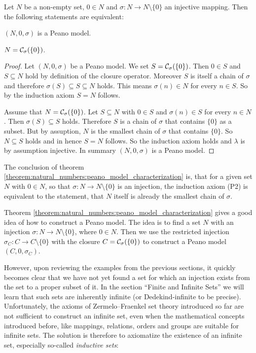 \begin{theorem}\label{theorem:natural_numbers:peano_model_characterization}
    Let $N$ be a non-empty set, $0\in N$ and $\sigma\colon N\to N\setminus\{0\}$ an injective mapping. Then the following statements are equivalent:
    \begin{intheoremenumerate}
        \item $(N,0,\sigma)$ is a Peano model.
        \item $N=\mathcal C_{\sigma}(\{0\})$.
    \end{intheoremenumerate}
\end{theorem}

\begin{proof}
     Let $(N,0,\sigma)$ be a Peano model. We set $S=\mathcal C_{\sigma}(\{0\})$. Then $0\in S$ and $S\subseteq N$ hold by definition of the closure operator. Moreover $S$ is itself a chain of $\sigma$ and therefore $\sigma(S)\subseteq S\subseteq N$ holds. This means $\sigma(n)\in N$ for every $n\in S$. So by the induction axiom $S=N$ follows.

     Assume that $N=\mathcal C_{\sigma}(\{0\})$. Let $S\subseteq N$ with $0\in S$ and $\sigma(n)\in S$ for every $n\in N$. Then $\sigma(S)\subseteq S$ holds. Therefore $S$ is a chain of $\sigma$ that contains $\{0\}$ as a subset. But by assuption, $N$ is the smallest chain of $\sigma$ that contains $\{0\}$. So $N\subseteq S$ holds and in hence $S=N$ follows. So the induction axiom holds and $\lambda$ is by assumption injective. In summary $(N,0,\sigma)$ is a Peano model.
\end{proof}

The conclusion of theorem \ref{theorem:natural_numbers:peano_model_characterization} is, that for a given set $N$ with $0\in N$, so that $\sigma\colon N\to N\setminus\{0\}$ is an injection, the induction axiom (P2) is equivalent to the statement, that $N$ itself is already the smallest chain of $\sigma$.

Theorem \ref{theorem:natural_numbers:peano_model_characterization} gives a good idea of how to construct a Peano model. The idea is to find a set $N$ with an injection $\sigma\colon N\to N\setminus\{0\}$, where $0\in N$. Then we use the restricted injection $\sigma_C\colon C\to C\setminus\{0\}$ with the closure $C=\mathcal C_{\sigma}(\{0\})$ to construct a Peano model $(C,0,\sigma_C)$.

However, upon reviewing the examples from the previous sections, it quickly becomes clear that we have not yet found a set for which an injection exists from the set to a proper subset of it. In the section \enquote{Finite and Infinite Sets} we will learn that such sets are inherently infinite (or Dedekind-infinite to be precise). Unfortunately, the axioms of Zermelo–Fraenkel set theory introduced so far are not sufficient to construct an infinite set, even when the mathematical concepts introduced before, like mappings, relations, orders and groups are suitable for infinite sets. The solution is therefore to axiomatize the existence of an infinite set, especially so-called \emph{inductive sets}:

